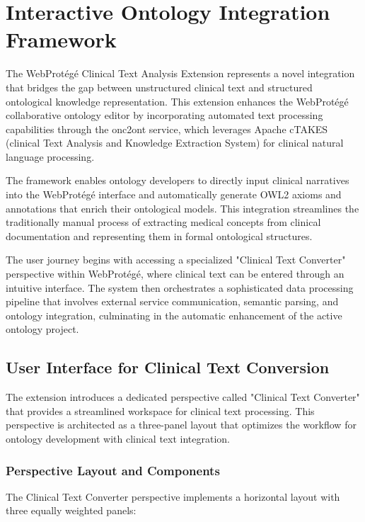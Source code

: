 
\section{Interactive Ontology Integration Framework}

The WebProtégé Clinical Text Analysis Extension represents a novel integration that bridges the gap between unstructured clinical text and structured ontological knowledge representation. This extension enhances the WebProtégé collaborative ontology editor by incorporating automated text processing capabilities through the onc2ont service, which leverages Apache cTAKES (clinical Text Analysis and Knowledge Extraction System) for clinical natural language processing.

The framework enables ontology developers to directly input clinical narratives into the WebProtégé interface and automatically generate OWL2 axioms and annotations that enrich their ontological models. This integration streamlines the traditionally manual process of extracting medical concepts from clinical documentation and representing them in formal ontological structures.

The user journey begins with accessing a specialized "Clinical Text Converter" perspective within WebProtégé, where clinical text can be entered through an intuitive interface. The system then orchestrates a sophisticated data processing pipeline that involves external service communication, semantic parsing, and ontology integration, culminating in the automatic enhancement of the active ontology project.

\subsection{User Interface for Clinical Text Conversion}

The extension introduces a dedicated perspective called "Clinical Text Converter" that provides a streamlined workspace for clinical text processing. This perspective is architected as a three-panel layout that optimizes the workflow for ontology development with clinical text integration.

\subsubsection{Perspective Layout and Components}

The Clinical Text Converter perspective implements a horizontal layout with three equally weighted panels:

